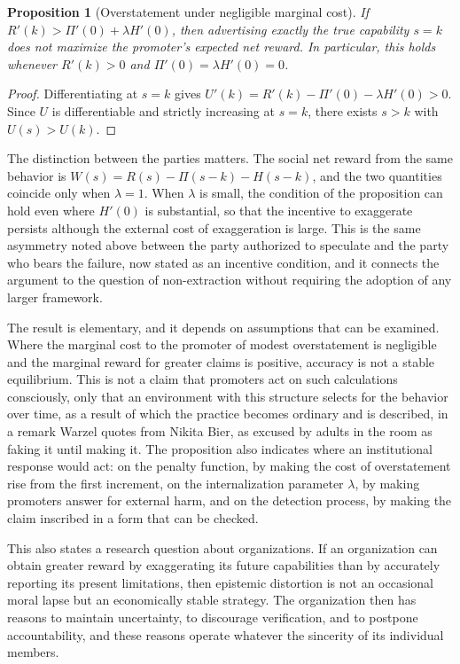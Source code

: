 \documentclass[11pt]{article}
\theoremstyle{plain}
\newtheorem{proposition}{Proposition}
\theoremstyle{definition}
\theoremstyle{remark}
\begin{document}
\begin{proposition}[Overstatement under negligible marginal cost]
If $R'(k) > \Pi'(0) + \lambda H'(0)$, then advertising exactly the true capability $s = k$ does not maximize the promoter's expected net reward. In particular, this holds whenever $R'(k) > 0$ and $\Pi'(0) = \lambda H'(0) = 0$.
\end{proposition}

\begin{proof}
Differentiating at $s = k$ gives $U'(k) = R'(k) - \Pi'(0) - \lambda H'(0) > 0$. Since $U$ is differentiable and strictly increasing at $s = k$, there exists $s > k$ with $U(s) > U(k)$.
\end{proof}

The distinction between the parties matters. The social net reward from the same behavior is $W(s) = R(s) - \Pi(s - k) - H(s - k)$, and the two quantities coincide only when $\lambda = 1$. When $\lambda$ is small, the condition of the proposition can hold even where $H'(0)$ is substantial, so that the incentive to exaggerate persists although the external cost of exaggeration is large. This is the same asymmetry noted above between the party authorized to speculate and the party who bears the failure, now stated as an incentive condition, and it connects the argument to the question of non-extraction without requiring the adoption of any larger framework.

The result is elementary, and it depends on assumptions that can be examined. Where the marginal cost to the promoter of modest overstatement is negligible and the marginal reward for greater claims is positive, accuracy is not a stable equilibrium. This is not a claim that promoters act on such calculations consciously, only that an environment with this structure selects for the behavior over time, as a result of which the practice becomes ordinary and is described, in a remark Warzel quotes from Nikita Bier, as excused by adults in the room as faking it until making it. The proposition also indicates where an institutional response would act: on the penalty function, by making the cost of overstatement rise from the first increment, on the internalization parameter $\lambda$, by making promoters answer for external harm, and on the detection process, by making the claim inscribed in a form that can be checked.

This also states a research question about organizations. If an organization can obtain greater reward by exaggerating its future capabilities than by accurately reporting its present limitations, then epistemic distortion is not an occasional moral lapse but an economically stable strategy. The organization then has reasons to maintain uncertainty, to discourage verification, and to postpone accountability, and these reasons operate whatever the sincerity of its individual members.
\end{document}

